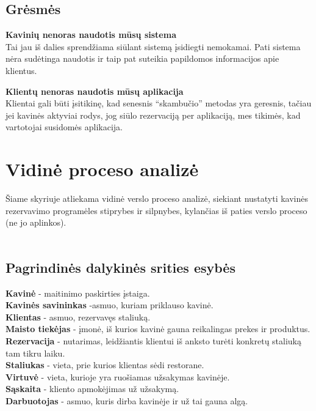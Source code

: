 \documentclass{VUMIFPSkursinis}
\begin{document}
\subsection{Grėsmės}
\textbf{Kavinių nenoras naudotis mūsų sistema}\\
Tai jau iš dalies sprendžiama siūlant sistemą įsidiegti nemokamai. Pati sistema nėra sudėtinga naudotis ir taip pat suteikia papildomos informacijos apie klientus.

\textbf{Klientų nenoras naudotis mūsų aplikacija}\\
Klientai gali būti įsitikinę, kad senesnis “skambučio” metodas yra geresnis, tačiau jei kavinės aktyviai rodys, jog siūlo rezervaciją per aplikaciją, mes tikimės, kad vartotojai susidomės aplikacija.


\section{Vidinė proceso analizė}

Šiame skyriuje atliekama vidinė verslo proceso analizė, siekiant nustatyti kavinės rezervavimo programėles stiprybes ir silpnybes, kylančias iš paties verslo proceso (ne jo aplinkos).\\\\

\subsection{Pagrindinės dalykinės srities esybės}
\noindent \textbf{Kavinė} - maitinimo paskirties įstaiga.\\
\textbf{Kavinės savininkas} -asmuo, kuriam priklauso kavinė.\\
\textbf{Klientas} - asmuo, rezervavęs staliuką. \\
\textbf{Maisto tiekėjas} - įmonė, iš kurios kavinė gauna reikalingas prekes ir produktus. \\
\textbf{Rezervacija} - nutarimas, leidžiantis klientui iš anksto turėti konkretų staliuką tam tikru laiku. \\
\textbf{Staliukas} - vieta, prie kurios klientas sėdi restorane.\\
\textbf{Virtuvė} - vieta, kurioje yra ruošiamas užsakymas kavinėje.\\
\textbf{Sąskaita} - kliento apmokėjimas už užsakymą.\\
\textbf{Darbuotojas} - asmuo, kuris dirba kavinėje ir už tai gauna algą.\\
\end{document}
